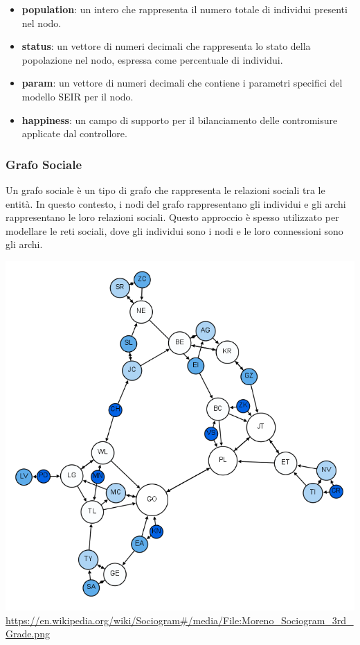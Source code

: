 \begin{itemize}
	\item \textbf{population}: un intero che rappresenta il numero totale 
	di individui presenti nel nodo.
	\item \textbf{status}: un vettore di numeri decimali che 
	rappresenta lo stato della popolazione nel nodo, espressa 
	come percentuale di individui.
	\item \textbf{param}: un vettore di numeri decimali che contiene 
	i parametri specifici del modello SEIR per il nodo.
	\item \textbf{happiness}: un campo di supporto per il bilanciamento 
	delle contromisure applicate dal controllore.
\end{itemize}

\subsubsection{Grafo Sociale}

Un grafo sociale è un tipo di grafo che rappresenta le relazioni sociali 
tra le entità. In questo contesto, i nodi del grafo rappresentano gli 
individui e gli archi rappresentano le loro relazioni sociali. 
Questo approccio è spesso utilizzato per modellare le reti sociali, 
dove gli individui sono i nodi e le loro connessioni sono gli archi.

\begin{minipage}{\linewidth}
    \centering
    \includegraphics[width=\textwidth]{img/Moreno_Sociogram_3rd_Grade.png}
	\url{https://en.wikipedia.org/wiki/Sociogram#/media/File:Moreno_Sociogram_3rd_Grade.png}
    \label{fig:social_graph}
\end{minipage}


